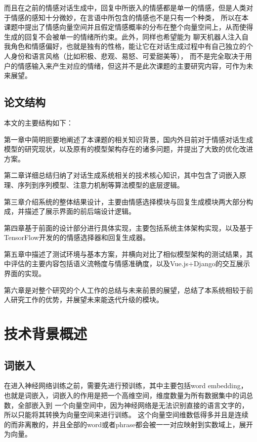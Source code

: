 \documentclass[supercite]{HustGraduPaper}
\theoremstyle{definition}
\begin{document}
而且在之前的情感对话生成中，回复中所嵌入的情感都是单一的情感，但是人类对于情感的感知十分微妙，在言语中所包含的情感也不是只有一个种类，
所以在本课题中提出了情感向量空间\cite{bao2019cyclegan}并且假定情感概率的分布在整个向量空间上，从而使得生成的回复不会被单一的情绪所约束。此外，同样也希望能为
聊天机器人注入自我角色和情感偏好，也就是独有的性格，能让它在对话生成过程中有自己独立的个人身份和语言风格\cite{li2016persona}（比如积极、悲观、易怒、可爱甜美等），
而不是完全取决于用户的情感输入来产生对应的情绪，但这并不是此次课题的主要研究内容，可作为未来展望。




\subsection{论文结构}
本文的主要结构如下：

第一章中简明扼要地阐述了本课题的相关知识背景，国内外目前对于情感对话生成模型的研究现状，以及原有的模型架构存在的诸多问题，并提出了大致的优化改进方案。

第二章详细总结归纳了对话生成系统相关的技术核心知识，其中包含了词嵌入原理、序列到序列模型、注意力机制等算法模型的底层逻辑。

第三章介绍系统的整体结果设计，主要由情感选择模块与回复生成模块两大部分构成，并描述了展示界面的前后端设计逻辑。

第四章基于前面的设计部分进行具体实现，主要包括系统主体架构实现，以及基于TensorFlow开发的的情感选择器和回复生成器。

第五章中描述了测试环境与基本方案，并横向对比了相似模型架构的测试结果，其中评估的主要内容包括语义流畅度与情感准确度，以及Vue.js+Django的交互展示界面的实现。

第六章是对整个研究的个人工作的总结与未来前景的展望，总结了本系统相较于前人研究工作的优势，并展望未来能迭代升级的模块。


\section{技术背景概述} 
\subsection{词嵌入}
在进入神经网络训练之前，需要先进行预训练，其中主要包括word embedding，也就是词嵌入，词嵌入的作用是把一个高维空间，维度数量为所有数据集中的词总数，全部嵌入到
一个向量空间中，因为神经网络是无法识别直接的语言文字的，所以只能将其转换为向量空间来进行训练。
这个向量空间维数低得多并且是连续的而非离散的，并且全部的word或者phrase都会被一一对应映射到实数域上，展开为向量。
\end{document}
